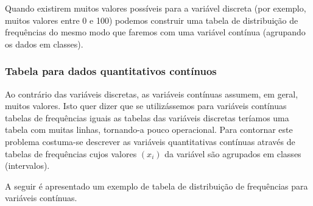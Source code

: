 \documentclass[11pt,fleqn]{book} %
\begin{document}
Quando existirem muitos valores possíveis para a variável discreta (por exemplo, muitos valores entre 0 e 100) podemos construir uma tabela de distribuição de frequências do mesmo modo que faremos com uma variável contínua (agrupando os dados em classes). \\



\subsubsection{Tabela para dados quantitativos contínuos}
\vspace{0,3cm}

Ao contrário das variáveis discretas, as variáveis contínuas assumem, em geral, muitos valores. Isto quer dizer que se utilizássemos para variáveis contínuas tabelas de frequências iguais as tabelas das variáveis discretas teríamos uma tabela com muitas linhas, tornando-a pouco operacional. Para contornar este problema costuma-se descrever as variáveis quantitativas contínuas através de tabelas de frequências cujos valores $(x_i)$ da variável são agrupados em classes (intervalos).

A seguir é apresentado um exemplo de tabela de distribuição de frequências para variáveis contínuas. \\
\end{document}
